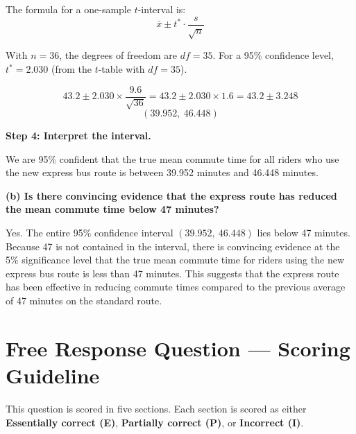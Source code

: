 \documentclass[12pt]{article}
\begin{document}
The formula for a one-sample $t$-interval is:
\[
\bar{x} \pm t^* \cdot \frac{s}{\sqrt{n}}
\]

With $n = 36$, the degrees of freedom are $df = 35$. For a 95\% confidence level, $t^* = 2.030$ (from the $t$-table with $df = 35$).

\[
43.2 \pm 2.030 \times \frac{9.6}{\sqrt{36}} = 43.2 \pm 2.030 \times 1.6 = 43.2 \pm 3.248
\]
\[
(39.952,\ 46.448)
\]

\textbf{Step 4: Interpret the interval.}

We are 95\% confident that the true mean commute time for all riders who use the new express bus route is between 39.952 minutes and 46.448 minutes.

\vspace{0.8cm}

\noindent\textbf{(b) Is there convincing evidence that the express route has reduced the mean commute time below 47 minutes?}

Yes. The entire 95\% confidence interval $(39.952,\ 46.448)$ lies below 47 minutes. Because 47 is not contained in the interval, there is convincing evidence at the 5\% significance level that the true mean commute time for riders using the new express bus route is less than 47 minutes. This suggests that the express route has been effective in reducing commute times compared to the previous average of 47 minutes on the standard route.

\newpage

\section*{Free Response Question --- Scoring Guideline}

\noindent This question is scored in five sections. Each section is scored as either \textbf{Essentially correct (E)}, \textbf{Partially correct (P)}, or \textbf{Incorrect (I)}.

\newpage
\end{document}
